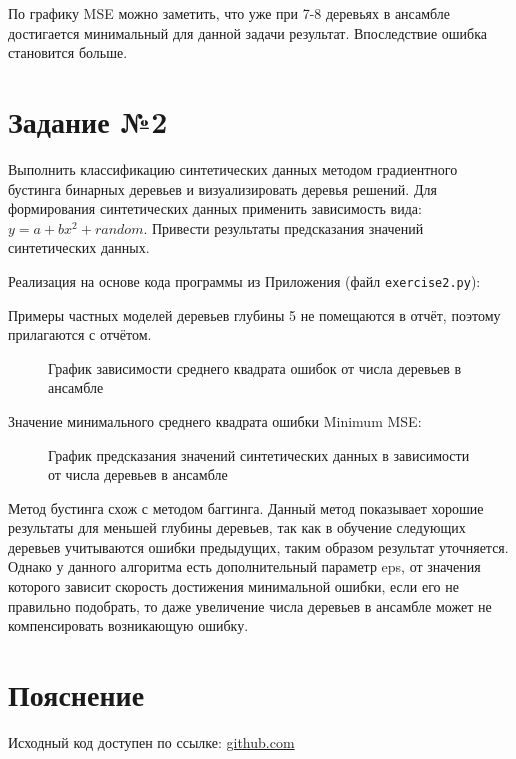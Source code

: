 \documentclass{article} %
\begin{document}
По графику MSE можно заметить, что уже при 7-8 деревьях в ансамбле достигается
минимальный для данной задачи результат. Впоследствие ошибка становится больше.

\clearpage
\section{Задание №2}
Выполнить классификацию синтетических данных методом градиентного бустинга бинарных
деревьев и визуализировать деревья решений.
Для формирования
синтетических данных применить зависимость вида: $y = a+b x^2 + random$. Привести
результаты предсказания значений синтетических данных.
\bigskip

Реализация на основе кода программы из Приложения (файл \verb$exercise2.py$):
\bigskip

Примеры частных моделей деревьев глубины 5 не помещаются в отчёт,
поэтому прилагаются с отчётом.

\begin{figure}[H]
    \centering
    \noindent{}
    \caption{График зависимости среднего квадрата ошибок от числа деревьев в ансамбле}
\end{figure}
\bigskip

Значение минимального среднего квадрата ошибки Minimum MSE:


\begin{figure}[H]
    \centering
    \noindent{}
    \caption{График предсказания значений синтетических данных в зависимости от числа деревьев в ансамбле}
\end{figure}
\bigskip

Метод бустинга схож с методом баггинга.
Данный метод показывает хорошие результаты для меньшей глубины деревьев,
так как в обучение следующих деревьев учитываются ошибки предыдущих,
таким образом результат уточняется. Однако у данного алгоритма есть
дополнительный параметр eps, от значения которого зависит скорость
достижения минимальной ошибки, если его не правильно подобрать,
то даже увеличение числа деревьев в ансамбле может не компенсировать возникающую ошибку.

\section{Пояснение}
Исходный код доступен по ссылке:
\href{https://github.com/SvichkarevAnatoly/Course-Python-Bioinformatics/tree/master/semester2/task8}
{github.com}
\end{document}

